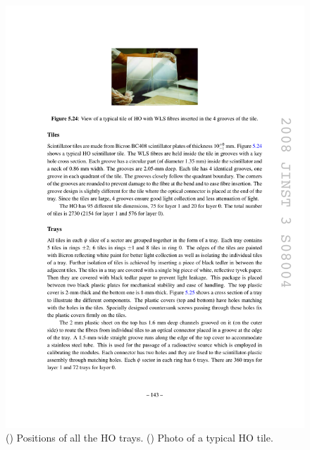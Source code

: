 \begin{figure}[hbtp]
\begin{center}
    \includegraphics[width=\cmsFigWidth]{figures/cms-hcal-HOtile}
    \caption{(\cmsLeft) Positions of all the HO trays. (\cmsRight) Photo of a typical HO tile.~\cite{1748-0221-3-08-S08004}}
    \label{fig:cms-hcal-HOtray}
  \end{center}
\end{figure}

